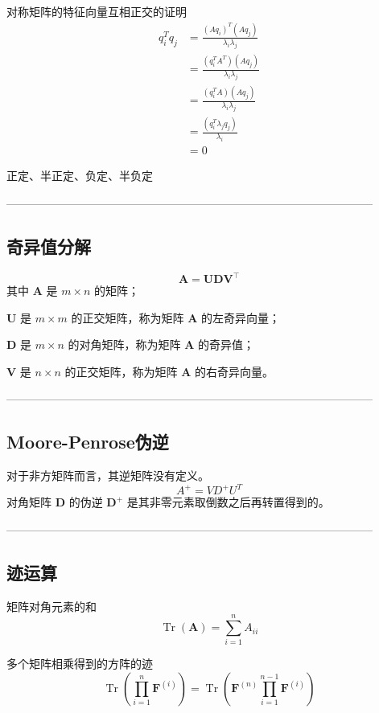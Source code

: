 \documentclass{article}
\begin{document}
对称矩阵的特征向量互相正交的证明
$$
\begin{aligned}
    q_i^T q_j &= \frac{(Aq_i)^T(Aq_j)}{\lambda_i \lambda_j} \\
    &= \frac{(q_i^T A^T)(Aq_j)}{\lambda_i \lambda_j} \\
    &= \frac{(q_i^T A)(Aq_j)}{\lambda_i \lambda_j} \\
    &= \frac{(q_i^T \lambda_j q_j)}{\lambda_i} \\
    &= 0
\end{aligned}
$$

正定、半正定、负定、半负定

--------------------------------------------------------------------------------------------------

\subsection{奇异值分解}
$$\mathbf{A} = \mathbf{U} \mathbf{D} \mathbf{V}^\top$$
其中 $\mathbf{A}$ 是 $ m \times n$ 的矩阵；

$\mathbf{U}$ 是 $ m \times m$ 的正交矩阵，称为矩阵 $\mathbf{A}$ 的左奇异向量；

$\mathbf{D}$ 是 $ m \times n$ 的对角矩阵，称为矩阵 $\mathbf{A}$ 的奇异值；

$\mathbf{V}$ 是 $ n \times n$ 的正交矩阵，称为矩阵 $\mathbf{A}$ 的右奇异向量。

--------------------------------------------------------------------------------------------------

\subsection{Moore-Penrose伪逆}
对于非方矩阵而言，其逆矩阵没有定义。
$$A^+ = V D^+ U^T$$
对角矩阵 $\mathbf{D}$ 的伪逆 $\mathbf{D}^+$ 是其非零元素取倒数之后再转置得到的。

--------------------------------------------------------------------------------------------------

\subsection{迹运算}
矩阵对角元素的和
$$\operatorname{Tr}(\mathbf{A}) = \sum_{i=1}^n A_{ii}$$

多个矩阵相乘得到的方阵的迹
$$\operatorname{Tr}\left(\prod_{i=1}^n \mathbf{F}^{(i)}\right)=\operatorname{Tr}\left(\mathbf{F}^{(n)}\prod_{i=1}^{n-1} \mathbf{F}^{(i)}\right)$$
\end{document}
